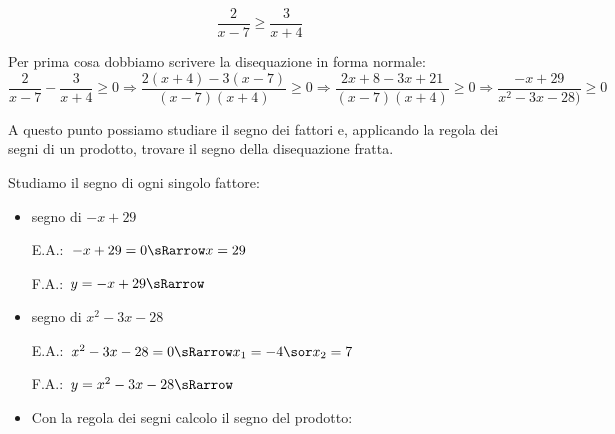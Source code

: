 \begin{esempio}
 \[\frac{2}{x-7} \ge \frac{3}{x+4}\]

Per prima cosa dobbiamo scrivere la disequazione in forma normale:
 \[\frac{2}{x-7} - \frac{3}{x+4} \ge 0 \Rightarrow 
   \frac{2(x+4) - 3(x-7)}{(x-7)(x+4)} \ge 0 \Rightarrow 
   \frac{2 x +8 -3x +21}{(x-7)(x+4)} \ge 0 \Rightarrow
   \frac{-x +29}{x^2-3x-28)} \ge 0\]

A questo punto possiamo studiare il segno dei fattori e, applicando la regola 
dei segni di un prodotto, trovare il segno della disequazione fratta.

Studiamo il segno di ogni singolo fattore:
\begin{itemize}

 \item  segno di \(-x +29\)\\
 \begin{minipage}{.35\textwidth}
  E.A.:~\(-x +29=0 \sRarrow x=29\)
  \vspace{1.8em}
 \end{minipage}
 \begin{minipage}{.25\textwidth}
  F.A.:~\(y=-x +29 \sRarrow \)
  \vspace{1.8em}
 \end{minipage}
 \begin{minipage}{.38\textwidth}
  \begin{inaccessibleblock}
\end{inaccessibleblock}
 \end{minipage}
 
 \item segno di \(x^2-3x-28\)\\
 \begin{minipage}{.35\textwidth}
  E.A.:~\(x^2-3x-28=0 \sRarrow x_1=-4 \sor x_2=7\)
 \end{minipage}
 \begin{minipage}{.25\textwidth}
  F.A.:~\(y=x^2-3x-28 \sRarrow\)
 \end{minipage}
 \begin{minipage}{.38\textwidth}
  \begin{inaccessibleblock}
\end{inaccessibleblock}
 \end{minipage}
 
 \item Con la regola dei segni calcolo il segno del prodotto:


\end{itemize}
\end{esempio}
